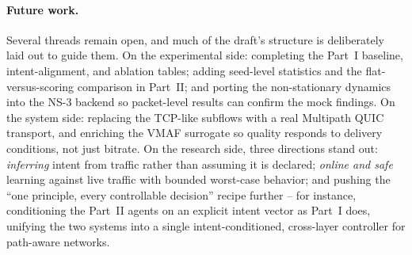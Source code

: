 \paragraph{Future work.} Several threads remain open, and much of the draft's structure is deliberately laid
out to guide them. On the experimental side: completing the Part~I baseline, intent-alignment, and ablation
tables; adding seed-level statistics and the flat-versus-scoring comparison in Part~II; and porting the
non-stationary dynamics into the NS-3 backend so packet-level results can confirm the mock findings. On the
system side: replacing the TCP-like subflows with a real Multipath QUIC transport, and enriching the VMAF
surrogate so quality responds to delivery conditions, not just bitrate. On the research side, three
directions stand out: \emph{inferring} intent from traffic rather than assuming it is declared; \emph{online
and safe} learning against live traffic with bounded worst-case behavior; and pushing the ``one principle,
every controllable decision'' recipe further -- for instance, conditioning the Part~II agents on an explicit
intent vector as Part~I does, unifying the two systems into a single intent-conditioned, cross-layer
controller for path-aware networks.
